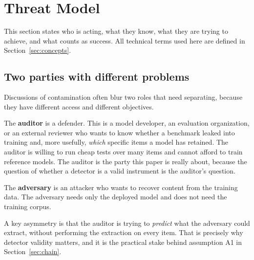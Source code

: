 %

\section{Threat Model}
\label{sec:threat}

This section states who is acting, what they know, what they are trying to achieve, and
what counts as success. All technical terms used here are defined in
Section~\ref{sec:concepts}.

\subsection{Two parties with different problems}
Discussions of contamination often blur two roles that need separating, because they have
different access and different objectives.

The \textbf{auditor} is a defender. This is a model developer, an evaluation
organization, or an external reviewer who wants to know whether a benchmark leaked into
training and, more usefully, \emph{which} specific items a model has retained. The
auditor is willing to run cheap tests over many items and cannot afford to train
reference models. The auditor is the party this paper is really about, because the
question of whether a detector is a valid instrument is the auditor's question.

The \textbf{adversary} is an attacker who wants to recover content from the training
data. The adversary needs only the deployed model and does not need the training corpus.

A key asymmetry is that the auditor is trying to \emph{predict} what the adversary could
extract, without performing the extraction on every item. That is precisely why detector
validity matters, and it is the practical stake behind assumption A1 in
Section~\ref{sec:chain}.

